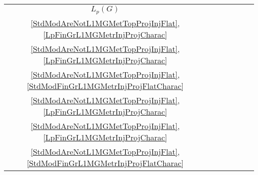 \begin{scriptsize}
\begin{longtable}{|c|c|c|c|c|c|c|}
 $L_p(G)$           & \begin{tabular}{@{}c@{}}$G=\{e_G\}$ \\ \ref{StdModAreNotL1MGMetTopProjInjFlat},\ref{LpFinGrL1MGMetrInjProjCharac}\end{tabular}                  & \begin{tabular}{@{}c@{}}$G=\{e_G\}$ \\ \ref{StdModAreNotL1MGMetTopProjInjFlat},\ref{LpFinGrL1MGMetrInjProjCharac}\end{tabular}                  & \begin{tabular}{@{}c@{}}$G=\{e_G\}$ \\ \ref{StdModAreNotL1MGMetTopProjInjFlat},\ref{StdModFinGrL1MGMetrInjProjFlatCharac}\end{tabular}           & \begin{tabular}{@{}c@{}}$G=\{e_G\}$ \\ \ref{StdModAreNotL1MGMetTopProjInjFlat},\ref{LpFinGrL1MGMetrInjProjCharac}\end{tabular}                 & \begin{tabular}{@{}c@{}}$G=\{e_G\}$ \\ \ref{StdModAreNotL1MGMetTopProjInjFlat},\ref{LpFinGrL1MGMetrInjProjCharac}\end{tabular}                   & \begin{tabular}{@{}c@{}}$G=\{e_G\}$ \\ \ref{StdModAreNotL1MGMetTopProjInjFlat},\ref{StdModFinGrL1MGMetrInjProjFlatCharac}\end{tabular}          \\
\hline

\end{longtable}
\end{scriptsize}
